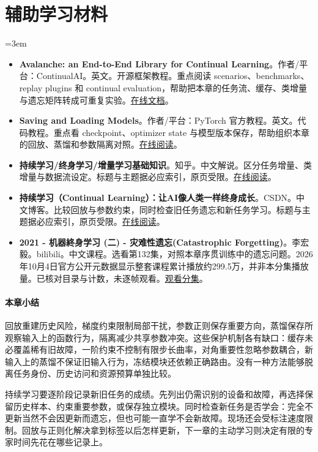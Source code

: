 \section*{辅助学习材料}
\begingroup
\emergencystretch=3em
\begin{itemize}
\item \textbf{Avalanche: an End-to-End Library for Continual Learning}。作者/平台：ContinualAI。英文。开源框架教程。重点阅读 scenarios、benchmarks、replay plugins 和 continual evaluation，帮助把本章的任务流、缓存、类增量与遗忘矩阵转成可重复实验。\href{https://avalanche.continualai.org/}{在线文档}。
\item \textbf{Saving and Loading Models}。作者/平台：PyTorch 官方教程。英文。代码教程。重点看 checkpoint、optimizer state 与模型版本保存，帮助组织本章的回放、蒸馏和参数隔离对照。\href{https://docs.pytorch.org/tutorials/beginner/saving\_loading\_models.html}{在线阅读}。
\item \textbf{持续学习/终身学习/增量学习基础知识}。知乎。中文解说。区分任务增量、类增量与数据流设定。标题与主题据必应索引，原页受限。\href{https://zhuanlan.zhihu.com/p/696297033}{在线阅读}。
\item \textbf{持续学习（Continual Learning）：让AI像人类一样终身成长}。CSDN。中文博客。比较回放与参数约束，同时检查旧任务遗忘和新任务学习。标题与主题据必应索引，原页受限。\href{https://blog.csdn.net/daqianai/article/details/152846877}{在线阅读}。
\item \textbf{2021 - 机器終身学习 (二) - 灾难性遗忘(Catastrophic Forgetting)}。李宏毅。bilibili。中文课程。选看第132集，对照本章序贯训练中的遗忘问题。2026年10月4日官方公开元数据显示整套课程累计播放约299.5万，并非本分集播放量。已核对目录与计数，未逐帧观看。\href{https://www.bilibili.com/video/BV1Wv411h7kN/?p=132}{观看分集}。
\end{itemize}
\endgroup
\paragraph{本章小结}
回放重建历史风险，梯度约束限制局部干扰，参数正则保存重要方向，蒸馏保存所观察输入上的函数行为，隔离减少共享参数冲突。这些保护机制各有缺口：缓存未必覆盖稀有旧故障，一阶约束不控制有限步长曲率，对角重要性忽略参数耦合，新输入上的蒸馏不保证旧输入行为，冻结模块还依赖正确路由。没有一种方法能够脱离任务身份、历史访问和资源预算单独比较。

持续学习要逐阶段记录新旧任务的成绩。先列出仍需识别的设备和故障，再选择保留历史样本、约束重要参数，或保存独立模块。同时检查新任务是否学会：完全不更新当然不会因更新而遗忘，但也可能一直学不会新故障。现场还会受标注速度限制。回放与正则化解决拿到标签以后怎样更新，下一章的主动学习则决定有限的专家时间先花在哪些记录上。
